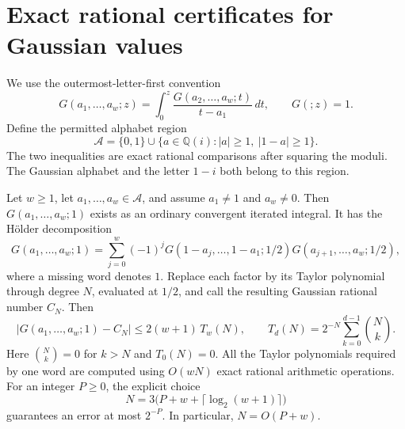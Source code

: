 \section{Exact rational certificates for Gaussian values}\label{holder:sec:certificates}

We use the outermost-letter-first convention
\[
 G(a_1,\ldots,a_w;z)=\int_0^z
       \frac{G(a_2,\ldots,a_w;t)}{t-a_1}\,dt,
 \qquad G(;z)=1.
\]
Define the permitted alphabet region
\[
 \mathcal A=\{0,1\}\cup
 \{a\in\mathbb Q(i): |a|\geq1,\ |1-a|\geq1\}.
\]
The two inequalities are exact rational comparisons after squaring the
moduli. The Gaussian alphabet and the letter $1-i$ both belong to this
region.

\begin{theorem}\label{holder:thm:certificate}
Let $w\geq1$, let $a_1,\ldots,a_w\in\mathcal A$, and assume
$a_1\ne1$ and $a_w\ne0$. Then $G(a_1,\ldots,a_w;1)$ exists as an ordinary
convergent iterated integral. It has the Hölder decomposition
\begin{equation}\label{holder:audit:eq:holder}
 G(a_1,\ldots,a_w;1)
 =\sum_{j=0}^w(-1)^j
  G(1-a_j,\ldots,1-a_1;1/2)
  G(a_{j+1},\ldots,a_w;1/2),
\end{equation}
where a missing word denotes $1$.
Replace each factor by its Taylor polynomial through degree $N$, evaluated
at $1/2$, and call the resulting Gaussian rational number $C_N$. Then
\begin{equation}\label{holder:audit:eq:radius}
 |G(a_1,\ldots,a_w;1)-C_N|
 \leq 2(w+1)\,T_w(N),\qquad
 T_d(N)=2^{-N}\sum_{k=0}^{d-1}\binom Nk.
\end{equation}
Here $\binom Nk=0$ for $k>N$ and $T_0(N)=0$.
All the Taylor polynomials required by one word are computed using
$O(wN)$ exact rational arithmetic operations.
For an integer $P\geq0$, the explicit choice
\begin{equation}\label{holder:audit:eq:Nchoice}
 N=3\bigl(P+w+\lceil\log_2(w+1)\rceil\bigr)
\end{equation}
guarantees an error at most $2^{-P}$. In particular, $N=O(P+w)$.
\end{theorem}

